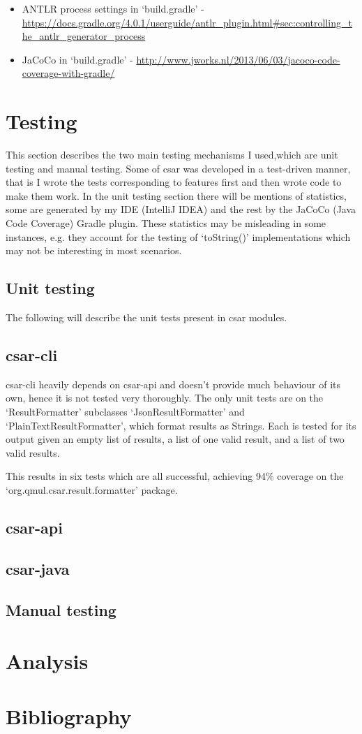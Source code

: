 \documentclass[12pt, letterpaper]{article}
\begin{document}
\begin{itemize}
  \item ANTLR process settings in `build.gradle' - \url{https://docs.gradle.org/4.0.1/userguide/antlr\_plugin.html\#sec:controlling\_the\_antlr\_generator\_process}
  \item JaCoCo in `build.gradle' - \url{http://www.jworks.nl/2013/06/03/jacoco-code-coverage-with-gradle/}
\end{itemize}

\section{Testing}
This section describes the two main testing mechanisms I used,which are unit testing and manual testing.
Some of csar was developed in a test-driven manner, that is I wrote the tests corresponding to features first and then wrote code to make them work.
In the unit testing section there will be mentions of statistics, some are generated by my IDE (IntelliJ IDEA) and the rest by the JaCoCo (Java Code Coverage) Gradle plugin.
These statistics may be misleading in some instances, e.g. they account for the testing of `toString()' implementations which may not be interesting in most scenarios.

\subsection{Unit testing}
The following will describe the unit tests present in csar modules.

\subsection{csar-cli}
csar-cli heavily depends on csar-api and doesn't provide much behaviour of its own, hence it is not tested very thoroughly.
The only unit tests are on the `ResultFormatter' subclasses `JsonResultFormatter' and `PlainTextResultFormatter', which format results as Strings.
Each is tested for its output given an empty list of results, a list of one valid result, and a list of two valid results.

This results in six tests which are all successful, achieving 94\% coverage on the `org.qmul.csar.result.formatter' package.

\subsection{csar-api}

\subsection{csar-java}

\subsection{Manual testing}

\section{Analysis}

\section{Bibliography}
\printbibliography[heading=none]
\end{document}
